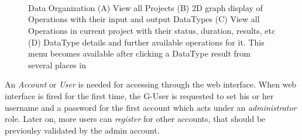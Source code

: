  \begin{figure}[!htbp]

		\centering
		\\
		\\
		\\
		\caption{\TVB Data Organization
		(A) View all Projects
		(B) 2D graph display of Operations with their input and output DataTypes 
		(C) View all Operations in current project with their status, duration, results, etc
		(D) DataType details and further available operations for it. This menu becomes available after clicking a DataType result from several places in \TVB }
				\label{fig:project}
\end{figure}

		An \emph{Account} or \emph{User} is needed for accessing \TVB through
		the web interface.  When \TVB web interface is fired for the first
		time, the G-User is requested to set his or her username and a
		password for the first account which acts under an
		\emph{administrator} role. Later on, more users can \emph{register}
		for other accounts, that should be previoulsy validated by the admin
		account.

